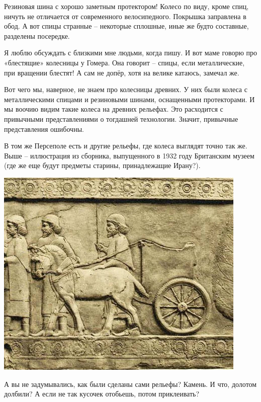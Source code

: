 Резиновая шина с хорошо заметным протектором! Колесо по виду, кроме спиц, ничуть не отличается от современного велосипедного. Покрышка заправлена в обод. А вот спицы странные – некоторые сплошные, иные же будто составные, разделены посередке.

Я люблю обсуждать с близкими мне людьми, когда пишу. И вот маме говорю про «блестящие» колесницы у Гомера. Она говорит – спицы, если металлические, при вращении блестят! А сам не допёр, хотя на велике катаюсь, замечал же. 

Вот чего мы, наверное, не знаем про колесницы древних. У них были колеса с металлическими спицами и резиновыми шинами, оснащенными протекторами. И мы воочию видим такие колеса на древних рельефах. Это расходится с привычными представлениями о тогдашней технологии. Значит, привычные представления ошибочны.

В том же Персеполе есть и другие рельефы, где колеса выглядят точно так же. Выше – иллюстрация из сборника, выпущенного в 1932 году Британским музеем (где же еще будут предметы старины, принадлежащие Ирану?). 

\begin{center}
\includegraphics[width=\textwidth]{chast-troya/gomer/protektor-01.jpg}
\end{center}


А вы не задумывались, как были сделаны сами рельефы? Камень. И что, долотом долбили? А если не так кусочек отобьешь, потом приклеивать?

